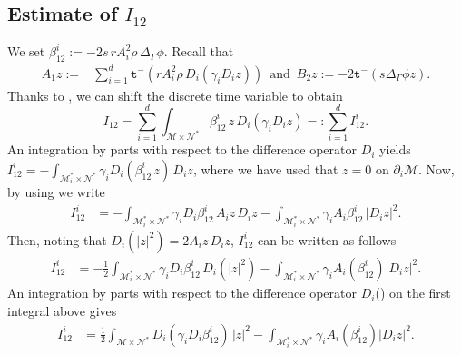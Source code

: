 \documentclass[11pt,oneside,leqno]{amsart}
\numberwithin{equation}{section}
\numberwithin{equation}{section}
\newcommand{\trm}{\mathtt t^-}
\begin{document}
\subsection{Estimate of $I_{12}$ }
We set $\beta_{12}^{i}:=-2s\,rA_{i}^{2}\rho\,\Delta_{\Gamma}\phi$. Recall that 
\begin{equation*}
    \begin{split}
        A_{1}z:=&\sum_{i=1}^{d}\trm(rA_{i}^{2}\rho\,D_{i}(\gamma_{i}D_{i}z))\,\text{ and } \,
        B_{2}z:=-2\trm(s\Delta_{\Gamma}\phi z).
    \end{split}
\end{equation*}
Thanks to \cite[Proposition 2, equation (2.4)]{LMPZ:2023}, we can shift the discrete 
time variable to obtain
\begin{equation*}
I_{12}=\sum_{i=1}^{d}\int_{\mathcal{M}\times\mathcal{N}^{\ast}}\beta_{12}^{i}\,z\,D_{i}(\gamma_{i}D_{i}z)=:\sum_{i=1}^{d}I^{i}_{12}.
\end{equation*}
An integration by parts with respect to the difference operator $D_{i}$ yields \break $\displaystyle 
    I_{12}^{i}=-\int_{\mathcal{M}^{\ast}_{i}\times\mathcal{N}^{\ast}}\gamma_{i}D_{i}( \beta_{12}^{i}\,z)\,D_{i}z$,
where we have used that $z=0$ on $\partial_{i}\mathcal{M}$. Now, by using  we write 
    \begin{equation*}
    \begin{split}
    I^{i}_{12}&=-\int_{\mathcal{M}^{\ast}_{i}\times\mathcal{N}^{\ast}}\gamma_{i}D_{i}\beta_{12}^{i}\,A_{i}z\,D_{i}z-\int_{\mathcal{M}^{\ast}_{i}\times\mathcal{N}^{\ast}}\gamma_{i}A_{i}\beta_{12}^{i}\,|D_{i}z|^{2}.
    \end{split}
\end{equation*}
Then, noting that $D_{i}(|z|^{2})=2A_{i}z\,D_{i}z$, $I_{12}^{i}$ can be written as follows
\begin{equation*}
    \begin{split}
    I_{12}^{i}&=-\frac{1}{2}\int_{\mathcal{M}^{\ast}_{i}\times\mathcal{N}^{\ast}}\gamma_{i}D_{i}\beta_{12}^{i}\,D_{i}(|z|^{2})-\int_{\mathcal{M}^{\ast}_{i}\times\mathcal{N}^{\ast}}\gamma_{i}A_{i}(\beta_{12}^{i})|D_{i}z|^{2}.
    \end{split}
\end{equation*}
An integration by parts with respect to the difference operator $D_{i}$(\cite[Lemma 2.2 equation (15)]{LDOP-2021}) on the first integral above gives
\begin{equation}
    \begin{split}
    I_{12}^{i}&=\frac{1}{2}\int_{\mathcal{M}\times\mathcal{N}^{\ast}}D_{i}(\gamma_{i}D_{i}\beta_{12}^{i})\,|z|^{2}-\int_{\mathcal{M}^{\ast}_{i}\times\mathcal{N}^{\ast}}\gamma_{i}A_{i}(\beta_{12}^{i})|D_{i}z|^{2}.
    \end{split}
\end{equation}
\end{document}
